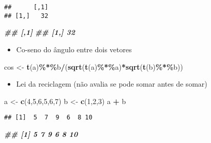 \documentclass[
]{article}
\newenvironment{Shaded}{\begin{snugshade}}{\end{snugshade}}
\newcommand{\DecValTok}[1]{\textcolor[rgb]{0.00,0.00,0.81}{#1}}
\newcommand{\DocumentationTok}[1]{\textcolor[rgb]{0.56,0.35,0.01}{\textbf{\textit{#1}}}}
\newcommand{\FunctionTok}[1]{\textcolor[rgb]{0.13,0.29,0.53}{\textbf{#1}}}
\newcommand{\NormalTok}[1]{#1}
\newcommand{\OtherTok}[1]{\textcolor[rgb]{0.56,0.35,0.01}{#1}}
\newcommand{\SpecialCharTok}[1]{\textcolor[rgb]{0.81,0.36,0.00}{\textbf{#1}}}
\providecommand{\tightlist}{%
  \setlength{\itemsep}{0pt}\setlength{\parskip}{0pt}}
\begin{document}
\begin{verbatim}
##      [,1]
## [1,]   32
\end{verbatim}

\begin{Shaded}
\begin{Highlighting}[]
\DocumentationTok{\#\#    [,1]}
\DocumentationTok{\#\# [1,] 32}
\end{Highlighting}
\end{Shaded}

\begin{itemize}
\tightlist
\item
  Co-seno do ângulo entre dois vetores
\end{itemize}

\begin{Shaded}
\begin{Highlighting}[]
\NormalTok{cos }\OtherTok{\textless{}{-}} \FunctionTok{t}\NormalTok{(a)}\SpecialCharTok{\%*\%}\NormalTok{b}\SpecialCharTok{/}\NormalTok{(}\FunctionTok{sqrt}\NormalTok{(}\FunctionTok{t}\NormalTok{(a)}\SpecialCharTok{\%*\%}\NormalTok{a)}\SpecialCharTok{*}\FunctionTok{sqrt}\NormalTok{(}\FunctionTok{t}\NormalTok{(b)}\SpecialCharTok{\%*\%}\NormalTok{b))}
\end{Highlighting}
\end{Shaded}

\begin{itemize}
\tightlist
\item
  Lei da reciclagem (não avalia se pode somar antes de somar)
\end{itemize}

\begin{Shaded}
\begin{Highlighting}[]
\NormalTok{a }\OtherTok{\textless{}{-}} \FunctionTok{c}\NormalTok{(}\DecValTok{4}\NormalTok{,}\DecValTok{5}\NormalTok{,}\DecValTok{6}\NormalTok{,}\DecValTok{5}\NormalTok{,}\DecValTok{6}\NormalTok{,}\DecValTok{7}\NormalTok{)}
\NormalTok{b }\OtherTok{\textless{}{-}} \FunctionTok{c}\NormalTok{(}\DecValTok{1}\NormalTok{,}\DecValTok{2}\NormalTok{,}\DecValTok{3}\NormalTok{)}
\NormalTok{a }\SpecialCharTok{+}\NormalTok{ b}
\end{Highlighting}
\end{Shaded}

\begin{verbatim}
## [1]  5  7  9  6  8 10
\end{verbatim}

\begin{Shaded}
\begin{Highlighting}[]
\DocumentationTok{\#\# [1] 5 7 9 6 8 10}
\end{Highlighting}
\end{Shaded}
\end{document}
